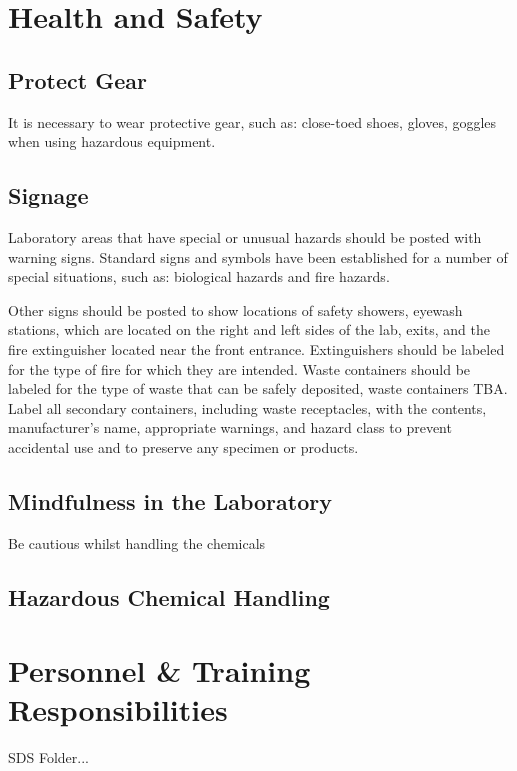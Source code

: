 \documentclass[12pt]{../SOP3_beta}\usepackage[]{graphicx}\usepackage[]{color}
\begin{document}
\section{Health and Safety}

\subsection{Protect Gear}

\NP It is necessary to wear protective gear, such as: close-toed shoes, gloves, goggles when using hazardous equipment.

\subsection{Signage}

\NP Laboratory areas that have special or unusual hazards should be posted with warning signs. Standard signs and symbols have been established for a number of special situations, such as: biological hazards and fire hazards.

\NP Other signs should be posted to show locations of safety showers, eyewash stations, which are located on the right and left sides of the lab, exits, and the fire extinguisher located near the front entrance. Extinguishers should be labeled for the type of fire for which they are intended. Waste containers should be labeled for the type of waste that can be safely deposited, waste containers TBA. Label all secondary containers, including waste receptacles, with the contents, manufacturer's name, appropriate warnings, and hazard class to prevent accidental use and to preserve any specimen or products. 

\subsection{Mindfulness in the Laboratory}

Be cautious whilst handling the chemicals

\subsection{Hazardous Chemical Handling}

\section{Personnel \& Training Responsibilities}

\NP SDS Folder...
\end{document}
